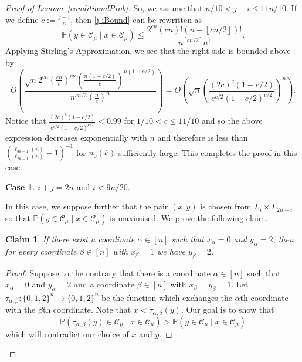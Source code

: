 \documentclass[11 pt]{article}
\newtheorem{claim}[equation]{Claim}
\theoremstyle{definition}
\theoremstyle{case}
\newtheorem{case4}{Case}
\numberwithin{equation}{section}
\begin{document}
\begin{proof}[Proof of Lemma~\ref{conditionalProb}]
So, we assume that $n/10 < j-i \leq 11n/10$. If we define $c:=\frac{j-i}{n}$, then \eqref{j-iBound} can be rewritten as
\[\mathbb{P}\left(y\in \mathcal{C}_\mu\mid x\in\mathcal{C}_\mu\right) \leq \frac{2^{cn} (cn)!(n-\left\lfloor cn/2\right\rfloor)!}{n^{\left\lceil cn/2\right\rceil}n!}.\] 
Applying Stirling's Approximation, we see that the right side is bounded above by
\[O\left(\frac{\sqrt{n} 2^{cn}\left(\frac{cn}{e}\right)^{cn}\left(\frac{n(1-c/2)}{e}\right)^{n(1-c/2)}}{n^{cn/2} \left(\frac{n}{e}\right)^n}\right)= O\left(\sqrt{n}\left(\frac{\left(2c\right)^{c}\left(1-c/2\right)}{e^{c/2}(1-c/2)^{c/2}}\right)^n\right).\]
Notice that $\frac{\left(2c\right)^{c}\left(1-c/2\right)}{e^{c/2}(1-c/2)^{c/2}}<0.99$ for $1/10 < c \leq 11/10$ and so the above expression decreases exponentially with $n$ and therefore is less than $\left(\frac{\ell_{3k-1}(n)}{\ell_{2k-1}(n)} - 1\right)^{-1}$ for $n_0(k)$ sufficiently large. This completes the proof in this case.

\begin{case4}
\label{bigSymmetricGap}
$i+j=2n$ and $i < 9n/20$.
\end{case4}

In this case, we suppose further that the pair $(x,y)$ is chosen from $L_i\times L_{2n-i}$ so that $\mathbb{P}\left(y\in\mathcal{C}_\mu\mid x\in\mathcal{C}_\mu\right)$ is maximised. We prove the following claim.

\begin{claim}
\label{1To2}
If there exist a coordinate $\alpha\in[n]$ such that $x_\alpha=0$ and $y_\alpha=2$, then for every coordinate $\beta\in[n]$ with $x_\beta=1$ we have $y_\beta=2$. 
\end{claim}

\begin{proof}
Suppose to the contrary that there is a coordinate $\alpha\in[n]$ such that $x_\alpha=0$ and $y_\alpha=2$ and a coordinate $\beta\in[n]$ with $x_\beta=y_\beta=1$. Let $\tau_{\alpha,\beta}:\{0,1,2\}^n\to\{0,1,2\}^n$ be the function which exchanges the $\alpha$th coordinate with the $\beta$th coordinate. Note that $x<\tau_{\alpha,\beta}(y)$. Our goal is to show that 
\[\mathbb{P}\left(\tau_{\alpha,\beta}(y)\in\mathcal{C}_\mu\mid x\in\mathcal{C}_\mu\right)> \mathbb{P}\left(y\in\mathcal{C}_\mu\mid x\in\mathcal{C}_\mu\right)\]
which will contradict our choice of $x$ and $y$. 



\end{proof}
\end{proof}
\end{document}
